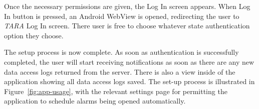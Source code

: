 Once the necessary permissions are given, the Log In screen appears. When Log In button is pressed, an Android WebView is opened, redirecting the user to \textit{TARA} Log In screen. There user is free to choose whatever state authentication option they choose.

The setup process is now complete. As soon as authentication is successfully completed, the user will start receiving notifications as soon as there are any new data access logs returned from the server. There is also a view inside of the application showing all data access logs saved. The set-up process is illustrated in Figure~\ref{fig:app-usage}, with the relevant settings page for permitting the application to schedule alarms being opened automatically.

\begin{figure}[H]
\centering
\begin{minipage}{0.32\textwidth}
    \centering

\end{minipage}
\end{figure}
